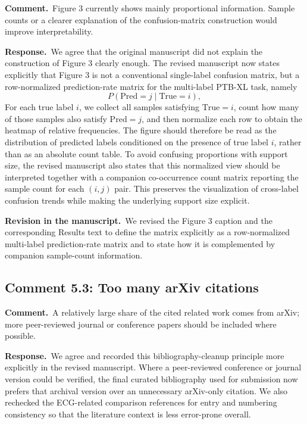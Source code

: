 \documentclass[11pt]{article}
\newcommand{\commentheader}{\textbf{Comment.}}
\newcommand{\responseheader}{\textbf{Response.}}
\newcommand{\revisionheader}{\textbf{Revision in the manuscript.}}
\begin{document}
\commentheader\ Figure 3 currently shows mainly proportional information. Sample counts or a clearer explanation of the confusion-matrix construction would improve interpretability.

\responseheader\ We agree that the original manuscript did not explain the construction of Figure 3 clearly enough. The revised manuscript now states explicitly that Figure 3 is not a conventional single-label confusion matrix, but a row-normalized prediction-rate matrix for the multi-label PTB-XL task, namely
\[
P(\mathrm{Pred}=j \mid \mathrm{True}=i),
\]
For each true label $i$, we collect all samples satisfying $\mathrm{True}=i$, count how many of those samples also satisfy $\mathrm{Pred}=j$, and then normalize each row to obtain the heatmap of relative frequencies. The figure should therefore be read as the distribution of predicted labels conditioned on the presence of true label $i$, rather than as an absolute count table. To avoid confusing proportions with support size, the revised manuscript also states that this normalized view should be interpreted together with a companion co-occurrence count matrix reporting the sample count for each $(i,j)$ pair. This preserves the visualization of cross-label confusion trends while making the underlying support size explicit.

\revisionheader\ We revised the Figure 3 caption and the corresponding Results text to define the matrix explicitly as a row-normalized multi-label prediction-rate matrix and to state how it is complemented by companion sample-count information.

\subsection*{Comment 5.3: Too many arXiv citations}

\commentheader\ A relatively large share of the cited related work comes from arXiv; more peer-reviewed journal or conference papers should be included where possible.

\responseheader\ We agree and recorded this bibliography-cleanup principle more explicitly in the revised manuscript. Where a peer-reviewed conference or journal version could be verified, the final curated bibliography used for submission now prefers that archival version over an unnecessary arXiv-only citation. We also rechecked the ECG-related comparison references for entry and numbering consistency so that the literature context is less error-prone overall.
\end{document}
